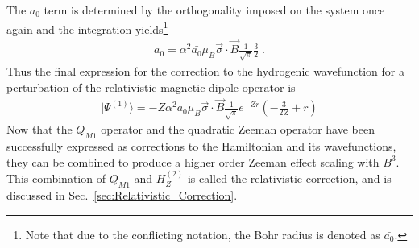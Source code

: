             \noindent The $a_0$ term is determined by the orthogonality imposed on the system once again and the integration yields\footnote{Note that due to the conflicting notation, the Bohr radius is denoted as $\bar{a_0}$.}
            \begin{align}
                a_0 =  \alpha^2 \bar{a_0} \mu_B \vec{\sigma} \cdot \vec{B} \frac{1}{\sqrt{\pi}} \frac{3}{2}\;.
            \end{align}
            \noindent Thus the final expression for the correction to the hydrogenic wavefunction for a perturbation of the relativistic magnetic dipole operator is 
            \begin{align}
                \vert \varPsi^{(1)} \rangle = - Z \alpha^2 a_0 \mu_B \vec{\sigma} \cdot \vec{B} \frac{1}{\sqrt{\pi}} e^{-Zr} \left( - \frac{3}{2Z} + r \right)
            \end{align}
            \noindent Now that the $Q_{M1}$ operator and the quadratic Zeeman operator have been successfully expressed as corrections to the Hamiltonian and its wavefunctions, they can be combined to produce a higher order Zeeman effect scaling with $B^3$. This combination of $Q_{M1}$ and $H_Z^{(2)}$ is called the relativistic correction, and is discussed in Sec.~\ref{sec:Relativistic_Correction}.
